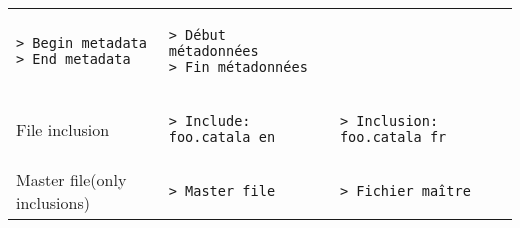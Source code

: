 \documentclass[a3paper,landscape]{article}
\begin{document}
\begin{multicols*}{2}
\begin{center}
\begin{tabular}{p{}p{}p{}}
\begin{verbatim}
> Begin metadata
> End metadata
\end{verbatim}
\vspace*{-1.75em}
&
\vspace*{-1.75em}
\begin{verbatim}
> Début métadonnées
> Fin métadonnées
\end{verbatim}
\vspace*{-1.75em}
\\
File inclusion&
\vspace*{-1.75em}
\begin{verbatim}
> Include: foo.catala_en
\end{verbatim}
\vspace*{-1.75em}
&
\vspace*{-1.75em}
\begin{verbatim}
> Inclusion: foo.catala_fr
\end{verbatim}
\vspace*{-1.75em}
\\
Master file\newline (only inclusions)&
\vspace*{-1.75em}
\begin{verbatim}
> Master file
\end{verbatim}
\vspace*{-1.75em}
&
\vspace*{-1.75em}
\begin{verbatim}
> Fichier maître
\end{verbatim}
\vspace*{-1.75em}
\\
\bottomrule
\end{tabular}
\end{center}
\newcommand*\FancyVerbStartString{```catala}
\newcommand*\FancyVerbStopString{```}















\end{multicols*}
\end{document}
